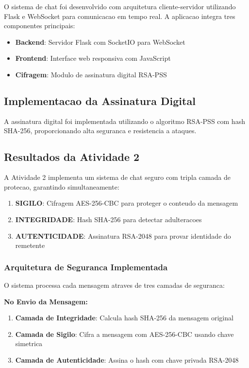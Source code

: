 \documentclass[12pt,a4paper,oneside]{article}
\begin{document}
O sistema de chat foi desenvolvido com arquitetura cliente-servidor utilizando Flask e WebSocket para comunicacao em tempo real. A aplicacao integra tres componentes principais:

\begin{itemize}
    \item \textbf{Backend}: Servidor Flask com SocketIO para WebSocket
    \item \textbf{Frontend}: Interface web responsiva com JavaScript
    \item \textbf{Cifragem}: Modulo de assinatura digital RSA-PSS
\end{itemize}

\subsection{Implementacao da Assinatura Digital}

A assinatura digital foi implementada utilizando o algoritmo RSA-PSS com hash SHA-256, proporcionando alta seguranca e resistencia a ataques.

\subsection{Resultados da Atividade 2}

A Atividade 2 implementa um sistema de chat seguro com tripla camada de protecao, garantindo simultaneamente:

\begin{enumerate}
    \item \textbf{SIGILO}: Cifragem AES-256-CBC para proteger o conteudo da mensagem
    \item \textbf{INTEGRIDADE}: Hash SHA-256 para detectar adulteracoes
    \item \textbf{AUTENTICIDADE}: Assinatura RSA-2048 para provar identidade do remetente
\end{enumerate}

\subsubsection{Arquitetura de Seguranca Implementada}

O sistema processa cada mensagem atraves de tres camadas de seguranca:

\textbf{No Envio da Mensagem:}
\begin{enumerate}
    \item \textbf{Camada de Integridade}: Calcula hash SHA-256 da mensagem original
    \item \textbf{Camada de Sigilo}: Cifra a mensagem com AES-256-CBC usando chave simetrica
    \item \textbf{Camada de Autenticidade}: Assina o hash com chave privada RSA-2048
\end{enumerate}
\end{document}

